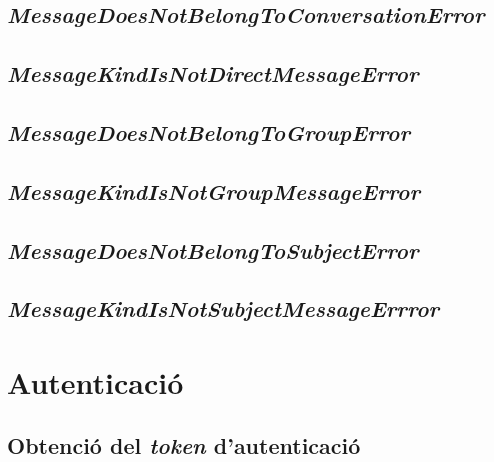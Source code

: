 \subsection{\emph{MessageDoesNotBelongToConversationError}}
\subsection{\emph{MessageKindIsNotDirectMessageError}}
\subsection{\emph{MessageDoesNotBelongToGroupError}}
\subsection{\emph{MessageKindIsNotGroupMessageError}}
\subsection{\emph{MessageDoesNotBelongToSubjectError}}
\subsection{\emph{MessageKindIsNotSubjectMessageErrror}}

\section{Autenticació}

\subsection{Obtenció del \emph{token} d'autenticació}

